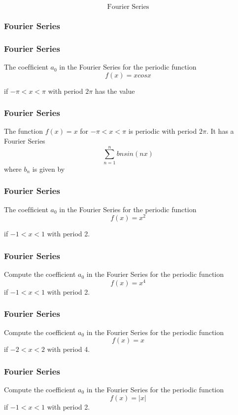 \documentclass{beamer}
\begin{document}
\begin{frame}
\Large
\[\mbox{Fourier Series}\]
\end{frame}
\begin{frame}
\frametitle{Fourier Series}
\end{frame}

\begin{frame}
\frametitle{Fourier Series}
The coefﬁcient $a_0$ in the Fourier Series for the periodic function
\[f(x) = x cos x \]

if $-\pi < x < \pi$ with period $2\pi$ has the value
\end{frame}
\begin{frame}
\frametitle{Fourier Series}
The function $f(x) = x$ for $-\pi < x < \pi$ is periodic with period $2\pi$. 
It has a Fourier Series 
\[ \sum^{n}_{n=1} bn sin(nx) \] where $b_n$ is given by
\end{frame}
\begin{frame}
\frametitle{Fourier Series}
The coefﬁcient $a_0$ in the Fourier Series for the periodic function
\[f(x) = x^2\]

if $-1 < x < 1$ with period 2.
\end{frame}

\begin{frame}
\frametitle{Fourier Series}
\Large

Compute the coefficient $a_0$ in the Fourier Series for the periodic function
\[f(x) = x^4\]
if $-1 < x < 1$ with period 2.
\end{frame}
\begin{frame}
\frametitle{Fourier Series}
\textbf{\Large}

Compute the coefficient $a_0$ in the Fourier Series for the periodic function
\[f(x) = x \]
if $-2 < x < 2$ with period 4.
\end{frame}
\begin{frame}
\Large
\frametitle{Fourier Series}

Compute the coefficient $a_0$ in the Fourier Series for the periodic function
\[f(x) = |x| \]
if $-1 < x < 1$ with period 2.
\end{frame}
\end{document}
